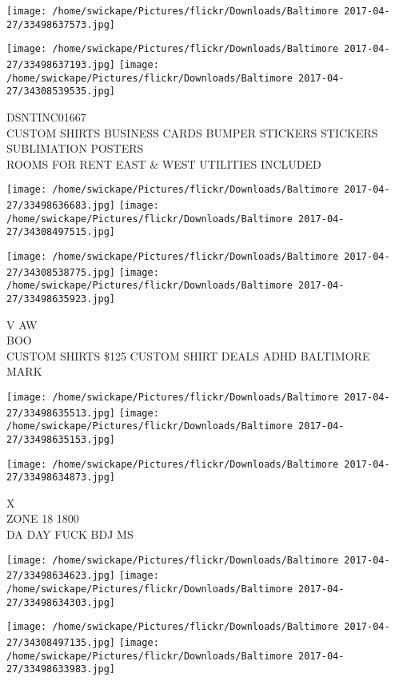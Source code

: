 \documentclass[10pt,letterpaper]{article}
\begin{document}
\texttt{[image: /home/swickape/Pictures/flickr/Downloads/Baltimore 2017-04-27/33498637573.jpg]}

\vspace{0.25in}
\texttt{[image: /home/swickape/Pictures/flickr/Downloads/Baltimore 2017-04-27/33498637193.jpg]}
\texttt{[image: /home/swickape/Pictures/flickr/Downloads/Baltimore 2017-04-27/34308539535.jpg]}

DSNTINC01667\\
CUSTOM SHIRTS BUSINESS CARDS BUMPER STICKERS STICKERS SUBLIMATION POSTERS\\
ROOMS FOR RENT EAST \& WEST UTILITIES INCLUDED\\
\pagebreak

\texttt{[image: /home/swickape/Pictures/flickr/Downloads/Baltimore 2017-04-27/33498636683.jpg]}
\texttt{[image: /home/swickape/Pictures/flickr/Downloads/Baltimore 2017-04-27/34308497515.jpg]}

\texttt{[image: /home/swickape/Pictures/flickr/Downloads/Baltimore 2017-04-27/34308538775.jpg]}
\texttt{[image: /home/swickape/Pictures/flickr/Downloads/Baltimore 2017-04-27/33498635923.jpg]}

V AW\\
BOO\\
CUSTOM SHIRTS \$125 CUSTOM SHIRT DEALS ADHD BALTIMORE\\
MARK\\
\pagebreak

\texttt{[image: /home/swickape/Pictures/flickr/Downloads/Baltimore 2017-04-27/33498635513.jpg]}
\texttt{[image: /home/swickape/Pictures/flickr/Downloads/Baltimore 2017-04-27/33498635153.jpg]}

\vspace{0.25in}
\texttt{[image: /home/swickape/Pictures/flickr/Downloads/Baltimore 2017-04-27/33498634873.jpg]}

X\\
ZONE 18 1800\\
DA DAY FUCK BDJ MS\\
\pagebreak

\texttt{[image: /home/swickape/Pictures/flickr/Downloads/Baltimore 2017-04-27/33498634623.jpg]}
\texttt{[image: /home/swickape/Pictures/flickr/Downloads/Baltimore 2017-04-27/33498634303.jpg]}

\texttt{[image: /home/swickape/Pictures/flickr/Downloads/Baltimore 2017-04-27/34308497135.jpg]}
\texttt{[image: /home/swickape/Pictures/flickr/Downloads/Baltimore 2017-04-27/33498633983.jpg]}
\end{document}
